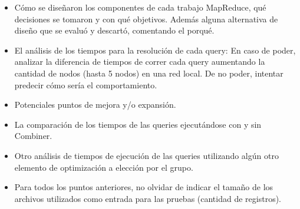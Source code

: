 \documentclass[a4paper,12pt]{article}
\begin{document}
	\begin{itemize}
		\item Cómo se diseñaron los componentes de cada trabajo MapReduce, qué decisiones se tomaron y con qué objetivos. Además alguna alternativa de diseño que se evaluó y descartó, comentando el porqué.
		\item El análisis de los tiempos para la resolución de cada query: En caso de poder, analizar la diferencia de tiempos de correr cada query aumentando la cantidad de nodos (hasta 5 nodos) en una red local. De no poder, intentar predecir cómo sería el comportamiento.
		\item Potenciales puntos de mejora y/o expansión.
		\item La comparación de los tiempos de las queries ejecutándose con y sin Combiner.
		\item Otro análisis de tiempos de ejecución de las queries utilizando algún otro elemento de optimización a elección por el grupo.
		\item Para todos los puntos anteriores, no olvidar de indicar el tamaño de los archivos utilizados como entrada para las pruebas (cantidad de registros).
	\end{itemize}
	
	
\end{document}
